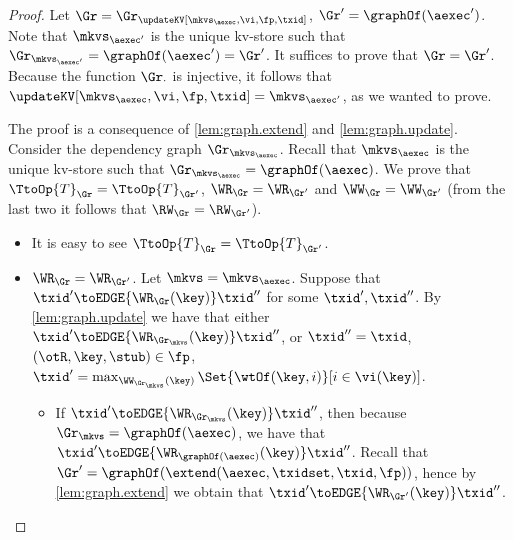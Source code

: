 \begin{proof}
Let $\Gr = \Gr_{\updateKV[\mkvs_{\aexec}, \vi, \fp, \txid]}$, $\Gr' = \graphOf(\aexec')$. 
Note that $\mkvs_{\aexec'}$ is the unique kv-store such that $\Gr_{\mkvs_{\aexec'}} = \graphOf(\aexec') = \Gr'$. 
It suffices to prove that $\Gr = \Gr'$. Because the function $\Gr_{\cdot}$ is injective, it follows that 
$\updateKV[\mkvs_{\aexec}, \vi, \fp, \txid] = \mkvs_{\aexec'}$, as we wanted to prove.  

The proof is a consequence of \cref{lem:graph.extend} and \cref{lem:graph.update}. 
Consider the dependency graph $\Gr_{\mkvs_{\aexec}}$.
Recall that $\mkvs_{\aexec}$ is the unique kv-store such that $\Gr_{\mkvs_{\aexec}} = \graphOf(\aexec)$. 
We prove that $\TtoOp{T}_{\Gr} = \TtoOp{T}_{\Gr'}$, $\WR_{\Gr} = \WR_{\Gr'}$ and 
$\WW_{\Gr} = \WW_{\Gr'}$ (from the last two it follows that $\RW_{\Gr} = \RW_{\Gr'}$). 
\begin{itemize}
\item It is easy to see $\TtoOp{T}_{\Gr} = \TtoOp{T}_{\Gr'}$.

\item $\WR_{\Gr} = \WR_{\Gr'}$.
Let \( \mkvs  = \mkvs_\aexec \).
Suppose that $\txid' \toEDGE{\WR_{\Gr}(\key)} \txid''$ for some $\txid', \txid''$. 
By \cref{lem:graph.update} we have that either $\txid' \toEDGE{\WR_{\Gr_\mkvs}(\key)} \txid''$, 
or $\txid'' = \txid$, $(\otR, \key, \stub) \in \fp$, $\txid' = \max_{\WW_{\Gr_\mkvs}(\key)}\Set{\wtOf(\key, i) }[i \in \vi(\key)]$. 

\begin{itemize}
\item If $\txid' \toEDGE{\WR_{\Gr_\mkvs}(\key)} \txid''$, then because 
$\Gr_\mkvs = \graphOf(\aexec)$, we have that $\txid' \toEDGE{\WR_{\graphOf(\aexec)}(\key)} \txid''$. 
Recall that $\Gr' = \graphOf(\extend(\aexec, \txidset, \txid, \fp))$, hence by \cref{lem:graph.extend} 
we obtain that $\txid' \toEDGE{\WR_{\Gr'}(\key)} \txid''$. 


\end{itemize}
\end{itemize}
\end{proof}
